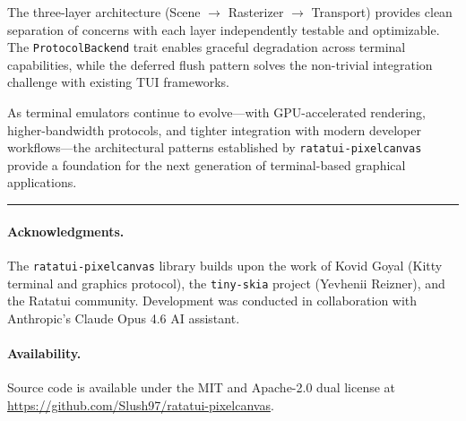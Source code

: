 \documentclass[11pt, a4paper, twocolumn]{article}
\begin{document}
The three-layer architecture (Scene $\to$ Rasterizer $\to$ Transport) provides clean separation of concerns with each layer independently testable and optimizable.
The \texttt{ProtocolBackend} trait enables graceful degradation across terminal capabilities, while the deferred flush pattern solves the non-trivial integration challenge with existing TUI frameworks.

As terminal emulators continue to evolve---with GPU-accelerated rendering, higher-bandwidth protocols, and tighter integration with modern developer workflows---the architectural patterns established by \texttt{ratatui-pixelcanvas} provide a foundation for the next generation of terminal-based graphical applications.

\vspace{1em}
\noindent\rule{\columnwidth}{0.4pt}

\small
\paragraph{Acknowledgments.}
The \texttt{ratatui-pixelcanvas} library builds upon the work of Kovid Goyal (Kitty terminal and graphics protocol), the \texttt{tiny-skia} project (Yevhenii Reizner), and the Ratatui community.
Development was conducted in collaboration with Anthropic's Claude Opus 4.6 AI assistant.

\paragraph{Availability.}
Source code is available under the MIT and Apache-2.0 dual license at \url{https://github.com/Slush97/ratatui-pixelcanvas}.
\end{document}
